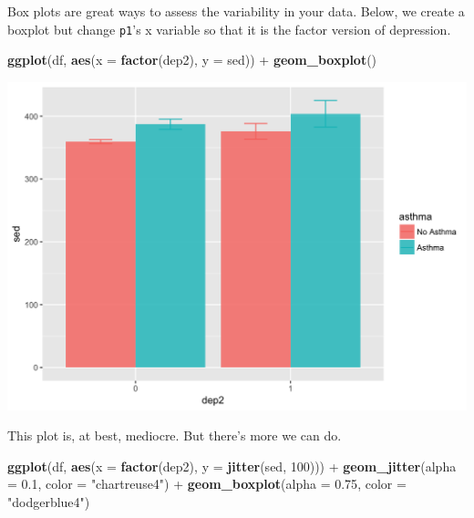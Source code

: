 \documentclass[]{tufte-book}
\newenvironment{Shaded}{}{}
\newcommand{\KeywordTok}[1]{\textcolor[rgb]{0.00,0.44,0.13}{\textbf{#1}}}
\newcommand{\DataTypeTok}[1]{\textcolor[rgb]{0.56,0.13,0.00}{#1}}
\newcommand{\DecValTok}[1]{\textcolor[rgb]{0.25,0.63,0.44}{#1}}
\newcommand{\FloatTok}[1]{\textcolor[rgb]{0.25,0.63,0.44}{#1}}
\newcommand{\StringTok}[1]{\textcolor[rgb]{0.25,0.44,0.63}{#1}}
\newcommand{\OperatorTok}[1]{\textcolor[rgb]{0.40,0.40,0.40}{#1}}
\newcommand{\NormalTok}[1]{#1}
\theoremstyle{definition}
\theoremstyle{definition}
\theoremstyle{remark}
\begin{document}
Box plots are great ways to assess the variability in your data. Below,
we create a boxplot but change \texttt{p1}'s x variable so that it is
the factor version of depression.

\begin{Shaded}
\begin{Highlighting}[]
\KeywordTok{ggplot}\NormalTok{(df, }\KeywordTok{aes}\NormalTok{(}\DataTypeTok{x =} \KeywordTok{factor}\NormalTok{(dep2), }\DataTypeTok{y =}\NormalTok{ sed)) }\OperatorTok{+}\StringTok{ }\KeywordTok{geom_boxplot}\NormalTok{()}
\end{Highlighting}
\end{Shaded}

\includegraphics{_main_files/figure-latex/unnamed-chunk-141-1}

This plot is, at best, mediocre. But there's more we can do.

\begin{Shaded}
\begin{Highlighting}[]
\KeywordTok{ggplot}\NormalTok{(df, }\KeywordTok{aes}\NormalTok{(}\DataTypeTok{x =} \KeywordTok{factor}\NormalTok{(dep2), }\DataTypeTok{y =} \KeywordTok{jitter}\NormalTok{(sed, }
    \DecValTok{100}\NormalTok{))) }\OperatorTok{+}\StringTok{ }\KeywordTok{geom_jitter}\NormalTok{(}\DataTypeTok{alpha =} \FloatTok{0.1}\NormalTok{, }\DataTypeTok{color =} \StringTok{"chartreuse4"}\NormalTok{) }\OperatorTok{+}\StringTok{ }
\StringTok{    }\KeywordTok{geom_boxplot}\NormalTok{(}\DataTypeTok{alpha =} \FloatTok{0.75}\NormalTok{, }\DataTypeTok{color =} \StringTok{"dodgerblue4"}\NormalTok{)}
\end{Highlighting}
\end{Shaded}
\end{document}
